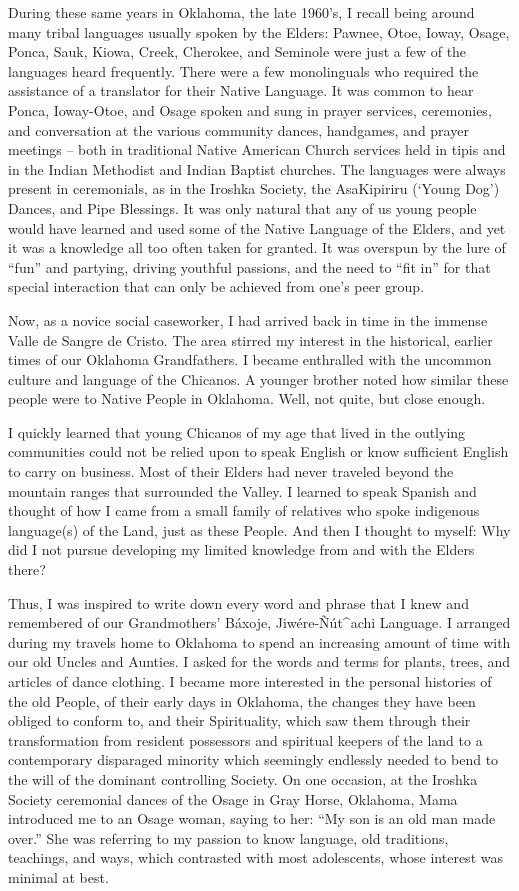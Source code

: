 \documentclass[output=paper]{LSP/langsci}
\begin{document}
During these same years in Oklahoma, the late 1960's, I recall being around many tribal languages usually spoken by the Elders: Pawnee, Otoe, Ioway, O\-sage, Ponca, Sauk, Kiowa, Creek, Cherokee, and Seminole were just a few of the languages heard frequently. There were a few monolinguals who required the assistance of a translator for their Native Language. It was common to hear Ponca, Ioway-Otoe, and Osage spoken and sung in prayer services, ceremonies, and conversation at the various community dances, handgames, and prayer meetings -- both in traditional Native American Church services held in tipis and in the Indian Methodist and Indian Baptist churches. The languages were always present in ceremonials, as in the Iroshka Society, the AsaKipiriru (`Young Dog') Dances, and Pipe Blessings. It was only natural that any of us young people would have learned and used some of the Native Language of the Elders, and yet it was a knowledge all too often taken for granted. It was overspun by the lure of ``fun'' and partying, driving youthful passions, and the need to ``fit in'' for that special interaction that can only be achieved from one's peer group.

Now, as a novice social caseworker, I had arrived back in time in the immense Valle de Sangre de Cristo. The area stirred my interest in the historical, earlier times of our Oklahoma Grandfathers. I became enthralled with the uncommon culture and language of the Chicanos. A younger brother noted how similar these people were to Native People in Oklahoma. Well, not quite, but close enough.

I quickly learned that young Chicanos of my age that lived in the outlying communities could not be relied upon to speak English or know sufficient English to carry on business. Most of their Elders had never traveled beyond the mountain ranges that surrounded the Valley. I learned to speak Spanish and thought of how I came from a small family of relatives who spoke indigenous language(s) of the Land, just as these People. And then I thought to myself: Why did I not pursue developing my limited knowledge from and with the Elders there?

Thus, I was inspired to write down every word and phrase that I knew and remembered of our Grandmothers' Báxoje, Jiwére-\~Nút\^{ }achi Language. I arranged during my travels home to Oklahoma to spend an increasing amount of time with our old Uncles and Aunties. I asked for the words and terms for plants, trees, and articles of dance clothing. I became more interested in the personal histories of the old People, of their early days in Oklahoma, the changes they have been obliged to conform to, and their Spirituality, which saw them through their transformation from resident possessors and spiritual keepers of the land to a contemporary disparaged minority which seemingly endlessly needed to bend to the will of the dominant controlling Society. On one occasion, at the Iroshka Society ceremonial dances of the O\-sage in Gray Horse, Oklahoma, Mama introduced me to an Osage woman, saying to her: ``My son is an old man made over.'' She was referring to my passion to know language, old traditions, teachings, and ways, which contrasted with most adolescents, whose interest was minimal at best.
\end{document}
